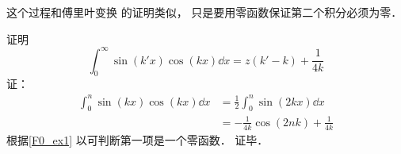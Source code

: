 这个过程和傅里叶变换 的证明类似， 只是要用零函数保证第二个积分必须为零．

\begin{example}{}
证明
\begin{equation}
\int_0^\infty \sin(k'x)\cos(kx) \dd{x} = z(k' - k) + \frac{1}{4k}
\end{equation}
证：
\begin{equation}
\begin{aligned}
\int_0^n \sin(kx)\cos(kx) \dd{x} &= \frac{1}{2} \int_0^n \sin(2kx) \dd{x}\\
&= -\frac{1}{4k}\cos(2nk) + \frac{1}{4k}
\end{aligned}
\end{equation}
根据\autoref{F0_ex1} 以可判断第一项是一个零函数． 证毕．
\end{example}
